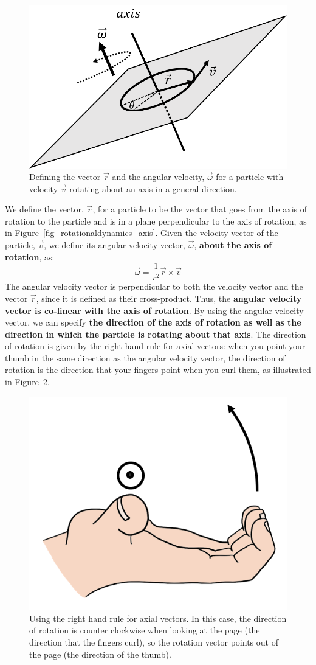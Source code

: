 \begin{figure}[!htbp]
\centering
\includegraphics[width=0.375\linewidth]{files/axis-75d811d50a499c9ab25572740f7803f0.png}
\caption[]{Defining the vector $\vec r$ and the angular velocity, $\vec \omega$ for a particle with velocity $\vec v$ rotating about an axis in a general direction.}
\label{fig_rotationaldynamics_axis }
\end{figure}

We define the vector, $\vec r$, for a particle to be the vector that goes from the axis of rotation to the particle and is in a plane perpendicular to the axis of rotation, as in Figure~\ref{fig_rotationaldynamics_axis}. Given the velocity vector of the particle, $\vec v$, we define its angular velocity vector, $\vec\omega$, \textbf{about the axis of rotation}, as:
\begin{equation}
\boxed{\vec \omega = \frac{1}{r^2} \vec r \times \vec v}
\end{equation}
The angular velocity vector is perpendicular to both the velocity vector and the vector $\vec r$, since it is defined as their cross-product. Thus, the \textbf{angular velocity vector is co-linear with the axis of rotation}. By using the angular velocity vector, we can specify \textbf{the direction of the axis of rotation as well as the direction in which the particle is rotating about that axis}. The direction of rotation is given by the right hand rule for axial vectors: when you point your thumb in the same direction as the angular velocity vector, the direction of rotation is the direction that your fingers point when you curl them, as illustrated in Figure~\ref{fig_rotationaldynamics_hand}.

\begin{figure}[!htbp]
\centering
\includegraphics[width=0.375\linewidth]{files/righthandruleaxial-b9e11f05b12444487db6c9f4d42438c9.png}
\caption[]{Using the right hand rule for axial vectors. In this case, the direction of rotation is counter clockwise when looking at the page (the direction that the fingers curl), so the rotation vector points out of the page (the direction of the thumb).}
\label{fig_rotationaldynamics_hand}
\end{figure}

